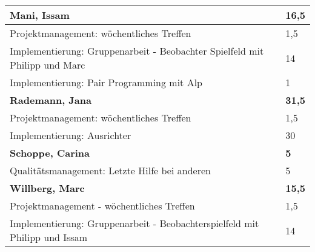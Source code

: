 \documentclass[a4paper,11pt]{scrartcl}
\begin{document}
\begin{longtable}{| p{13.8cm} | C{2.4cm} |}

	\textbf{Mani, Issam} & \textbf{16,5}\\ %
	\hline

  Projektmanagement: wöchentliches Treffen
	&
  1,5
	\\
	\hline

  Implementierung: Gruppenarbeit - Beobachter Spielfeld mit Philipp und Marc
	&
  14
	\\
	\hline

  Implementierung: Pair Programming mit Alp
	&
  1
	\\
	\hline
	\hline


	\textbf{Rademann, Jana} & \textbf{31,5}\\ %
	\hline

  Projektmanagement: wöchentliches Treffen
	&
  1,5
	\\
	\hline

  Implementierung: Ausrichter
	&
  30
	\\
	\hline
	\hline


	\textbf{Schoppe, Carina} & \textbf{5}\\ %
	\hline

  Qualitätsmanagement: Letzte Hilfe bei anderen
	&
  5
	\\
	\hline
	\hline


	\textbf{Willberg, Marc} & \textbf{15,5}\\ %
	\hline

  Projektmanagement - wöchentliches Treffen
	&
  1,5
	\\
	\hline

  Implementierung: Gruppenarbeit - Beobachterspielfeld mit Philipp und Issam
	&
  14
	\\
	\hline

\end{longtable}
\end{document}
